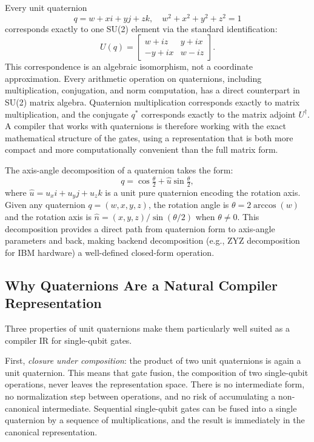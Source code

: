 \documentclass[conference]{IEEEtran}
\begin{document}
Every unit quaternion
\begin{equation}
q = w + xi + yj + zk, \quad w^2 + x^2 + y^2 + z^2 = 1
\label{eq:quat}
\end{equation}
corresponds exactly to one SU(2) element via the standard identification:
\begin{equation}
U(q) =
\begin{bmatrix}
 w + iz  &  y + ix \\
-y + ix  &  w - iz
\end{bmatrix}.
\label{eq:su2matrix}
\end{equation}
This correspondence is an algebraic isomorphism, not a coordinate approximation.
Every arithmetic operation on quaternions, including multiplication, conjugation, and norm
computation, has a direct counterpart in SU(2) matrix algebra. Quaternion
multiplication corresponds exactly to matrix multiplication, and the conjugate $q^*$
corresponds exactly to the matrix adjoint $U^\dagger$. A compiler that works with
quaternions is therefore working with the exact mathematical structure of the gates,
using a representation that is both more compact and more computationally convenient than
the full matrix form.

The axis-angle decomposition of a quaternion takes the form:
\begin{equation}
q = \cos\!\tfrac{\theta}{2} + \hat{u}\sin\!\tfrac{\theta}{2},
\label{eq:axisangle}
\end{equation}
where $\hat{u} = u_x i + u_y j + u_z k$ is a unit pure quaternion encoding the rotation
axis. Given any quaternion $q = (w, x, y, z)$, the rotation angle is $\theta = 2\arccos(w)$
and the rotation axis is $\hat{n} = (x, y, z) / \sin(\theta/2)$ when $\theta \neq 0$.
This decomposition provides a direct path from quaternion form to axis-angle parameters
and back, making backend decomposition (e.g., ZYZ decomposition for IBM hardware) a
well-defined closed-form operation.

\subsection{Why Quaternions Are a Natural Compiler Representation}

Three properties of unit quaternions make them particularly well suited as a compiler IR
for single-qubit gates.

First, \textit{closure under composition}: the product of two unit quaternions is again a
unit quaternion. This means that gate fusion, the composition of two single-qubit
operations, never leaves the representation space. There is no intermediate form, no
normalization step between operations, and no risk of accumulating a non-canonical
intermediate. Sequential single-qubit gates can be fused into a single quaternion by a
sequence of multiplications, and the result is immediately in the canonical representation.
\end{document}
